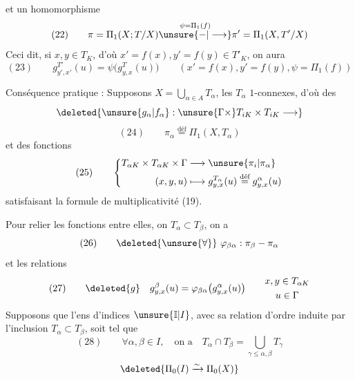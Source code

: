 et un homomorphisme
\[
(22)\qquad\pi=\Pi_1(X;T/X)\overset{\psi=\Pi_1(f)}{\unsure{\mathbin{-}|\longrightarrow}}\pi'=\Pi_1(X,T'/X)
\]
Ceci dit, si $x,y\in T_K$, d'où $x'=f(x),y'=f(y)\in T'_K$, on aura
\[
(23)\qquad g_{y',x'}^{T'}(u)=\psi\bigl(g_{y,x}^T(u)\bigr)
\qquad(x'=f(x),y'=f(y),\psi=\Pi_1(f))
\]

Conséquence pratique : Supposons $X=\bigcup_{\alpha\in A}T_\alpha$, les $T_\alpha$ $1$-connexes, d'où des  
\[
\deleted{\unsure{g_\alpha|f_\alpha}:\unsure{\Gamma\times}T_{iK}\times T_{iK}\longrightarrow}
\]
\[
(24)\qquad \pi_\alpha\overset{\text{déf}}{=}\Pi_1(X,T_\alpha)
\]
et des fonctions
\[
(25)\qquad\left\{\begin{aligned}
T_{\alpha K}\times T_{\alpha K}\times\Gamma&\longrightarrow\unsure{\pi_i|\pi_\alpha}\\
(x,y,u)&\longmapsto g_{y,x}^{T_\alpha}(u)\overset{\text{déf}}{=}g_{y,x}^{\alpha}(u)
\end{aligned}\right.
\]
satisfaisant la formule de multiplicativité (19).

Pour relier les fonctions entre elles,  on   $T_\alpha\subset T_\beta$, on a
\[
(26)\qquad\deleted{\unsure{\forall}}\ \varphi_{\beta\alpha}:\pi_\beta\mathbin{-}\pi_\alpha
\]
et les relations
\[
(27)\qquad\deleted{g}\quad g_{y,x}^{\beta}(u)=\varphi_{\beta\alpha}\bigl(g_{y,x}^{\alpha}(u)\bigr)\qquad\begin{gathered}x,y\in T_{\alpha K}\\u\in\Gamma\end{gathered}
\]
Supposons que l'ens d'indices $\unsure{\mathbb{I}|I}$, avec sa relation d'ordre induite par l'inclusion $T_\alpha\subset T_\beta$, soit tel que 
\[
(28)\qquad\forall\alpha,\beta\in I,\quad\text{on a}\quad T_\alpha\cap T_\beta=\bigcup_{\gamma\le\alpha,\beta}T_\gamma
\]
\[
\deleted{\Pi_0(I)\xrightarrow{\sim}\Pi_0(X)}
\]
